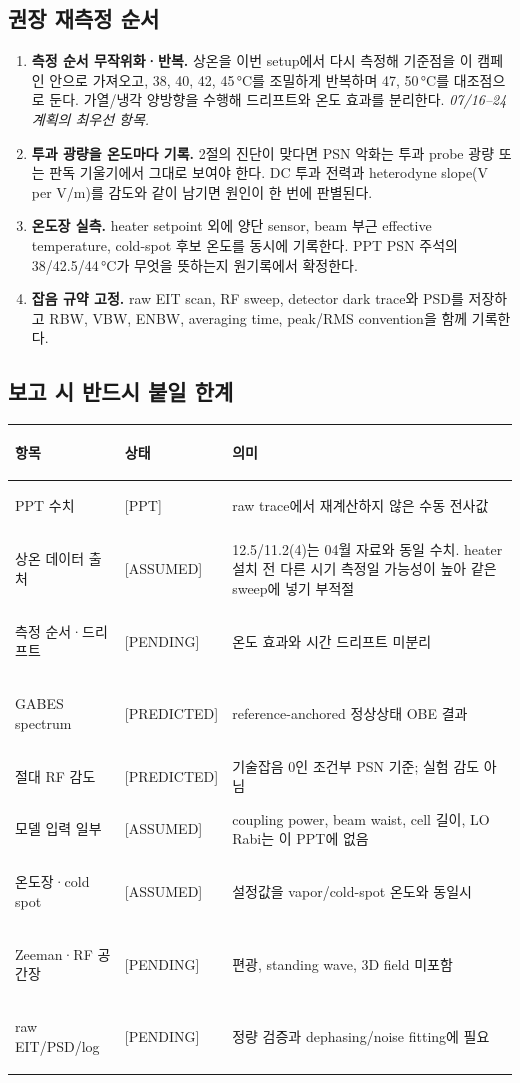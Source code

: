\documentclass[10pt,a4paper]{article}
\newcommand{\Status}[1]{\textsf{\footnotesize[#1]}}
\begin{document}
\subsection*{권장 재측정 순서}

\begin{enumerate}
  \setlength{\itemsep}{0.22em}
  \item \textbf{측정 순서 무작위화·반복.} 상온을 이번 setup에서 다시 측정해 기준점을 이 캠페인 안으로
        가져오고, 38, 40, 42, 45\,°C를 조밀하게 반복하며 47, 50\,°C를 대조점으로 둔다. 가열/냉각
        양방향을 수행해 드리프트와 온도 효과를 분리한다. \emph{07/16--24 계획의 최우선 항목.}
  \item \textbf{투과 광량을 온도마다 기록.} 2절의 진단이 맞다면 PSN 악화는 투과 probe 광량 또는
        판독 기울기에서 그대로 보여야 한다. DC 투과 전력과 heterodyne slope(V per V/m)를 감도와
        같이 남기면 원인이 한 번에 판별된다.
  \item \textbf{온도장 실측.} heater setpoint 외에 양단 sensor, beam 부근 effective temperature,
        cold-spot 후보 온도를 동시에 기록한다. PPT PSN 주석의 38/42.5/44\,°C가 무엇을 뜻하는지
        원기록에서 확정한다.
  \item \textbf{잡음 규약 고정.} raw EIT scan, RF sweep, detector dark trace와 PSD를 저장하고
        RBW, VBW, ENBW, averaging time, peak/RMS convention을 함께 기록한다.
\end{enumerate}

\subsection*{보고 시 반드시 붙일 한계}

\begin{tabularx}{\textwidth}{>{\bfseries\raggedright\arraybackslash}p{3.35cm}p{2.05cm}X}
\toprule
항목 & 상태 & 의미\\
\midrule
PPT 수치 & \Status{PPT} & raw trace에서 재계산하지 않은 수동 전사값\\
상온 데이터 출처 & \Status{ASSUMED} & 12.5/11.2(4)는 04월 자료와 동일 수치. heater 설치 전
다른 시기 측정일 가능성이 높아 같은 sweep에 넣기 부적절\\
측정 순서·드리프트 & \Status{PENDING} & 온도 효과와 시간 드리프트 미분리\\
GABES spectrum & \Status{PREDICTED} & reference-anchored 정상상태 OBE 결과\\
절대 RF 감도 & \Status{PREDICTED} & 기술잡음 0인 조건부 PSN 기준; 실험 감도 아님\\
모델 입력 일부 & \Status{ASSUMED} & coupling power, beam waist, cell 길이, LO Rabi는 이 PPT에 없음\\
온도장·cold spot & \Status{ASSUMED} & 설정값을 vapor/cold-spot 온도와 동일시\\
Zeeman·RF 공간장 & \Status{PENDING} & 편광, standing wave, 3D field 미포함\\
raw EIT/PSD/log & \Status{PENDING} & 정량 검증과 dephasing/noise fitting에 필요\\
\bottomrule
\end{tabularx}
\end{document}
